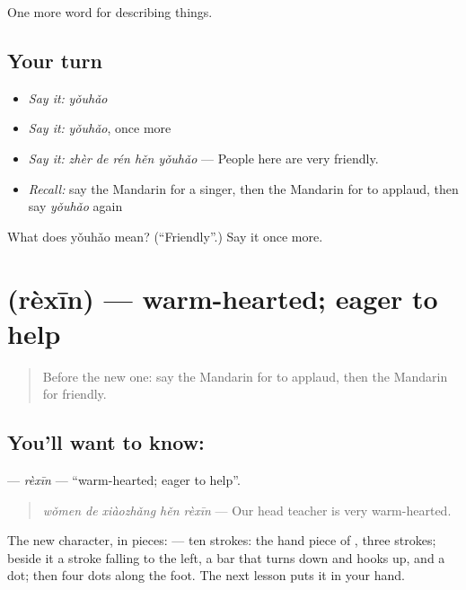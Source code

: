 \begin{grammarlens}[title={What you've built}]
One more word for describing things.
\end{grammarlens}

\subsection*{Your turn}
\begin{itemize}
\raggedright
  \item \emph{Say it:} \emph{yǒuhǎo}
  \item \emph{Say it:} \emph{yǒuhǎo}, once more
  \item \emph{Say it:} \emph{zhèr de rén hěn yǒuhǎo} — People here are very friendly.
  \item \emph{Recall:} say the Mandarin for a singer, then the Mandarin for to applaud, then say \emph{yǒuhǎo} again
\end{itemize}

\begin{tcolorbox}[breakable,colback=teal!4,colframe=teal!35!black,title={Before you move on}]
What does yǒuhǎo mean? (\textquotedblleft{}Friendly\textquotedblright{}.) Say it once more.
\end{tcolorbox}
\section[\texorpdfstring{\zh{热心} (rèxīn)}{热心 (rèxīn)}]{ (rèxīn) — warm-hearted; eager to help}

\label{lesson:ZH-C258-rexin}



\begin{quote}
Before the new one: say the Mandarin for to applaud, then the Mandarin for friendly.
\end{quote}

\subsection*{You'll want to know: }
\textbf{} — \emph{rèxīn} — \textquotedblleft{}warm-hearted; eager to help\textquotedblright{}.

\begin{quote}
\textbf{} \emph{wǒmen de xiàozhǎng hěn rèxīn} — Our head teacher is very warm-hearted.
\end{quote}

The new character, in pieces:  — ten strokes: the hand piece of , three strokes; beside it a stroke falling to the left, a bar that turns down and hooks up, and a dot; then four dots along the foot. The next lesson puts it in your hand.

